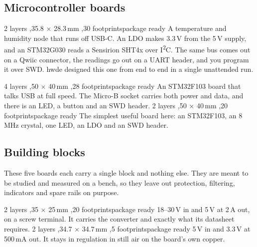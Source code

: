 \newpage

\subsection{Microcontroller boards}

\setlength{\boardh}{6cm}
%
{2 layers \sep 35.8 $\times$ 28.3\,mm \sep 30 footprints}{package ready}%
{A temperature and humidity node that runs off USB-C. An LDO makes 3.3\,V from
the 5\,V supply, and an STM32G030 reads a Sensirion SHT4x over
I\textsuperscript{2}C. The same bus comes out on a Qwiic connector, the
readings go out on a UART header, and you program it over SWD. hwde designed
this one from end to end in a single unattended run.}
\setlength{\boardh}{9cm}

\boardpair
{%
{4 layers \sep 50 $\times$ 40\,mm \sep 28 footprints}{package ready}%
{An STM32F103 board that talks USB at full speed. The Micro-B socket carries
both power and data, and there is an LED, a button and an SWD header.}}
{%
{2 layers \sep 50 $\times$ 40\,mm \sep 20 footprints}{package ready}%
{The simplest useful board here: an STM32F103, an 8\,MHz crystal, one LED, an
LDO and an SWD header.}}

\newpage

\subsection{Building blocks}

These five boards each carry a single block and nothing else. They are meant
to be studied and measured on a bench, so they leave out protection,
filtering, indicators and spare rails on purpose.

\boardpair
{%
{2 layers \sep 35 $\times$ 25\,mm \sep 20 footprints}{package ready}%
{18--30\,V in and 5\,V at 2\,A out, on a screw terminal. It carries the
converter and exactly what its datasheet requires.}}
{%
{2 layers \sep 34.7 $\times$ 34.7\,mm \sep 5 footprints}{package ready}%
{5\,V in and 3.3\,V at 500\,mA out. It stays in regulation in still air on the
board's own copper.}}

